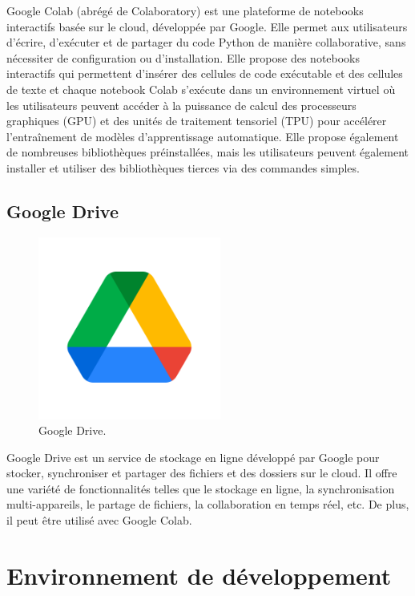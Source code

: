 Google Colab (abrégé de Colaboratory) est une plateforme de notebooks
interactifs basée sur le cloud, développée par Google. Elle permet aux
utilisateurs d'écrire, d'exécuter et de partager du code Python de manière
collaborative, sans nécessiter de configuration ou d'installation. Elle propose
des notebooks interactifs qui permettent d'insérer des cellules de code
exécutable et des cellules de texte et chaque notebook Colab s'exécute dans un
environnement virtuel où les utilisateurs peuvent accéder à la puissance de
calcul des processeurs graphiques (GPU) et des unités de traitement tensoriel
(TPU) pour accélérer l'entraînement de modèles d'apprentissage automatique.
Elle propose également de nombreuses bibliothèques préinstallées, mais les
utilisateurs peuvent également installer et utiliser des bibliothèques tierces
via des commandes simples.

\subsection{Google Drive}

\begin{figure}[hbt!]
  \centering
  \includegraphics[width=6cm]{images_pfe/drive.png}
  \caption{Google Drive.}
  \label{fig:drive}
\end{figure}
\FloatBarrier
\medskip

Google Drive est un service de stockage en ligne développé par Google pour
stocker, synchroniser et partager des fichiers et des dossiers sur le cloud. Il
offre une variété de fonctionnalités telles que le stockage en ligne, la
synchronisation multi-appareils, le partage de fichiers, la collaboration en
temps réel, etc. De plus, il peut être utilisé avec Google Colab.


\section{Environnement de développement}

